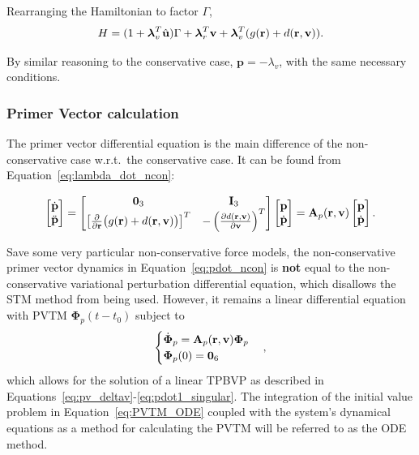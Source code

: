 Rearranging the Hamiltonian to factor \(\Gamma \), 
\begin{equation}
    H = (1 + \boldsymbol{\lambda}_v^T \hat{\mathbf{u}}) \Gamma + \boldsymbol{\lambda}_r^T \mathbf{v} + \boldsymbol{\lambda}_v^T (g(\mathbf{r}) + d(\mathbf{r}, \mathbf{v})).
\end{equation}

By similar reasoning to the conservative case, \(\mathbf{p} = - \lambda_v\), with the same necessary conditions. 

\subsubsection{Primer Vector calculation}\label{sssec:pv_calc_ncon}

The primer vector differential equation is the main difference of the non-conservative case w.r.t.\ the conservative case. It can be found from Equation~\eqref{eq:lambda_dot_ncon}:

\begin{equation}\label{eq:pdot_ncon}
    \begin{bmatrix}
        \dot{\mathbf{p}} \\ \ddot{\mathbf{p}}
    \end{bmatrix} = \begin{bmatrix}
        \mathbf{0}_3 & \mathbf{I}_3 \\
        \left[\frac{\partial }{\partial \mathbf{r}}\big(g(\mathbf{r}) + d(\pos, \vel)\big)\right]^T & -\left(\frac{\partial d(\pos, \vel)}{\partial \vel}\right)^T
    \end{bmatrix} \begin{bmatrix}
        \mathbf{p} \\ \dot{\mathbf{p}}
    \end{bmatrix} = \mathbf{A}_p(\pos, \vel) \begin{bmatrix}
        \mathbf{p} \\ \dot{\mathbf{p}}
    \end{bmatrix}.
\end{equation}

Save some very particular non-conservative force models, the non-conservative primer vector dynamics in Equation~\eqref{eq:pdot_ncon} is \textbf{not} equal to the non-conservative variational perturbation differential equation, which disallows the STM method from being used. However, it remains a linear differential equation with PVTM \(\mathbf{\Phi}_p(t - t_0)\) subject to 
\begin{equation}\label{eq:PVTM_ODE}
    \begin{cases}
        \dot{\mathbf{\Phi}}_p = \mathbf{A}_p(\pos, \vel) \mathbf{\Phi}_p \\
        \mathbf{\Phi}_p(0) = \mathbf{0}_6
    \end{cases},
\end{equation}
which allows for the solution of a linear TPBVP as described in Equations~\eqref{eq:pv_deltav}-\eqref{eq:pdot1_singular}. The integration of the initial value problem in Equation~\eqref{eq:PVTM_ODE} coupled with the system's dynamical equations as a method for calculating the PVTM will be referred to as the ODE method. 

